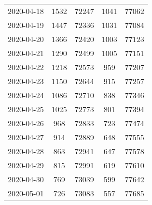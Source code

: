 \begin{longtable}{ccccc}
2020-04-18&1532&72247&1041&77062\\
2020-04-19&1447&72336&1031&77084\\
2020-04-20&1366&72420&1003&77123\\
2020-04-21&1290&72499&1005&77151\\
2020-04-22&1218&72573&959&77207\\
2020-04-23&1150&72644&915&77257\\
2020-04-24&1086&72710&838&77346\\
2020-04-25&1025&72773&801&77394\\
2020-04-26&968&72833&723&77474\\
2020-04-27&914&72889&648&77555\\
2020-04-28&863&72941&647&77578\\
2020-04-29&815&72991&619&77610\\
2020-04-30&769&73039&599&77642\\
2020-05-01&726&73083&557&77685\\
\hline
\end{longtable}